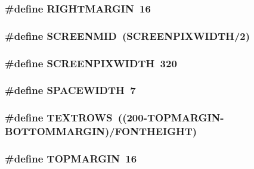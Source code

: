 \hypertarget{WL__TEXT_8C_ab9c51858681a43e5c47aa4c3c6b384ac}{
\subsubsection[{RIGHTMARGIN}]{\setlength{\rightskip}{0pt plus 5cm}\#define RIGHTMARGIN~16}}
\label{WL__TEXT_8C_ab9c51858681a43e5c47aa4c3c6b384ac}
\hypertarget{WL__TEXT_8C_ad8da423c66adb10fef50e7aedcafb4bc}{
\subsubsection[{SCREENMID}]{\setlength{\rightskip}{0pt plus 5cm}\#define SCREENMID~(SCREENPIXWIDTH/2)}}
\label{WL__TEXT_8C_ad8da423c66adb10fef50e7aedcafb4bc}
\hypertarget{WL__TEXT_8C_a409c2c5ee4972d60b10fb2a716d9241e}{
\subsubsection[{SCREENPIXWIDTH}]{\setlength{\rightskip}{0pt plus 5cm}\#define SCREENPIXWIDTH~320}}
\label{WL__TEXT_8C_a409c2c5ee4972d60b10fb2a716d9241e}
\hypertarget{WL__TEXT_8C_adc11e3b6b1c6fb65d8bade01c0255a3c}{
\subsubsection[{SPACEWIDTH}]{\setlength{\rightskip}{0pt plus 5cm}\#define SPACEWIDTH~7}}
\label{WL__TEXT_8C_adc11e3b6b1c6fb65d8bade01c0255a3c}
\hypertarget{WL__TEXT_8C_a7338d62a66f372c5a177134cbd9e198a}{
\subsubsection[{TEXTROWS}]{\setlength{\rightskip}{0pt plus 5cm}\#define TEXTROWS~((200-\/TOPMARGIN-\/BOTTOMMARGIN)/FONTHEIGHT)}}
\label{WL__TEXT_8C_a7338d62a66f372c5a177134cbd9e198a}
\hypertarget{WL__TEXT_8C_a750781fb573476126fd36fea5ebd3e56}{
\subsubsection[{TOPMARGIN}]{\setlength{\rightskip}{0pt plus 5cm}\#define TOPMARGIN~16}}
